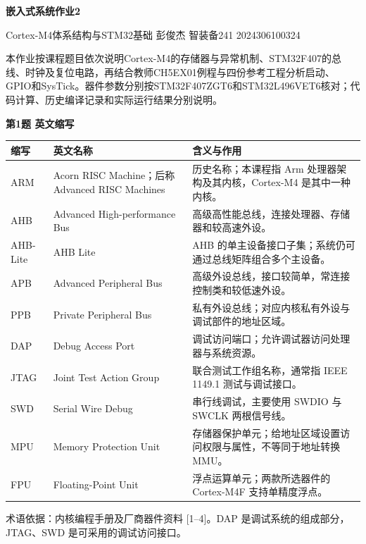 \documentclass[10pt,a4paper]{article}
\newcommand{\qtitle}[1]{{\Large\bfseries #1}\par\vspace{4pt}}
\newcommand{\qsub}[1]{{\bfseries #1}\par}
\begin{document}
\qtitle{嵌入式系统作业2}
{\small Cortex-M4体系结构与STM32基础  彭俊杰  智装备241  2024306100324}\par
本作业按课程题目依次说明Cortex-M4的存储器与异常机制、STM32F407的总线、时钟及复位电路，再结合教师CH5EX01例程与四份参考工程分析启动、GPIO和SysTick。器件参数分别按STM32F407ZGT6和STM32L496VET6核对；代码计算、历史编译记录和实际运行结果分别说明。

\qsub{第1题 英文缩写}
\begingroup\small
\begin{tabularx}{\linewidth}{|>{\hsize}Y|>{\hsize}Y|>{\hsize}Y|}\hline
{}
\textbf{缩写} & \textbf{英文名称} & \textbf{含义与作用} \\ \hline
ARM & Acorn RISC Machine；后称 Advanced RISC Machines & 历史名称；本课程指 Arm 处理器架构及其内核，Cortex-M4 是其中一种内核。 \\ \hline
AHB & Advanced High-performance Bus & 高级高性能总线，连接处理器、存储器和较高速外设。 \\ \hline
AHB-Lite & AHB Lite & AHB 的单主设备接口子集；系统仍可通过总线矩阵组合多个主设备。 \\ \hline
APB & Advanced Peripheral Bus & 高级外设总线，接口较简单，常连接控制类和较低速外设。 \\ \hline
PPB & Private Peripheral Bus & 私有外设总线；对应内核私有外设与调试部件的地址区域。 \\ \hline
DAP & Debug Access Port & 调试访问端口；允许调试器访问处理器与系统资源。 \\ \hline
JTAG & Joint Test Action Group & 联合测试工作组名称，通常指 IEEE 1149.1 测试与调试接口。 \\ \hline
SWD & Serial Wire Debug & 串行线调试，主要使用 SWDIO 与 SWCLK 两根信号线。 \\ \hline
MPU & Memory Protection Unit & 存储器保护单元；给地址区域设置访问权限与属性，不等同于地址转换MMU。 \\ \hline
FPU & Floating-Point Unit & 浮点运算单元；两款所选器件的 Cortex-M4F 支持单精度浮点。 \\ \hline
\end{tabularx}
\endgroup\par
术语依据：内核编程手册及厂商器件资料 [1–4]。DAP 是调试系统的组成部分，JTAG、SWD 是可采用的调试访问接口。
\end{document}
